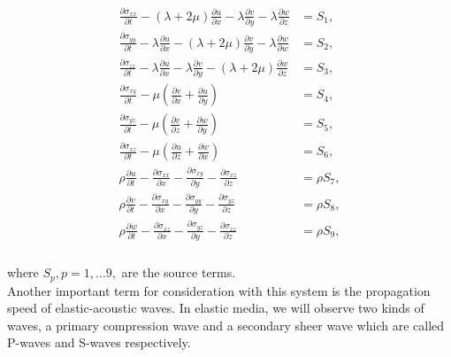 \begin{align}
    \begin{split}
    \frac{\partial \sigma_{xx}}{\partial t} - \left(\lambda  + 2\mu\right)\frac{\partial u}{\partial x} - \lambda \frac{\partial v}{\partial y} - \lambda\frac{\partial w}{\partial z} &= S_1, \\    
    \frac{\partial \sigma_{yy}}{\partial t} - \lambda \frac{\partial u}{\partial x} - \left( \lambda + 2 \mu \right)\frac{\partial v}{\partial y} - \lambda \frac{\partial w}{\partial w} &= S_2, \\
    \frac{\partial \sigma_{zz}}{\partial t} - \lambda \frac{\partial u}{\partial x} - \lambda \frac{\partial v}{\partial y} - \left(\lambda + 2\mu\right)\frac{\partial w}{\partial z} &= S_3, \\
    \frac{\partial \sigma_{xy}}{\partial t} - \mu \left(\frac{\partial v}{\partial x} + \frac{\partial u}{\partial y}\right) &= S_4, \\ 
    \frac{\partial \sigma_{yz}}{\partial t} - \mu \left(\frac{\partial v}{\partial z} + \frac{\partial w}{\partial y}\right) &= S_5, \\
    \frac{\partial \sigma_{xz}}{\partial t} - \mu \left(\frac{\partial u}{\partial z} + \frac{\partial w}{\partial x}\right) &= S_6, \\
    \rho \frac{\partial u}{\partial t} - \frac{\partial \sigma_{xx}}{\partial x} - \frac{\partial \sigma_{xy}}{\partial y} - \frac{\partial \sigma_{xz}}{\partial z} &= \rho S_7, \\
    \rho \frac{\partial v}{\partial t} - \frac{\partial \sigma_{xy}}{\partial x} - \frac{\partial \sigma_{yy}}{\partial y} - \frac{\partial \sigma_{yz}}{\partial z} &= \rho S_8, \\
    \rho \frac{\partial w}{\partial t} - \frac{\partial \sigma_{xz}}{\partial x} - \frac{\partial \sigma_{yz}}{\partial y} - \frac{\partial \sigma_{zz}}{\partial z} &= \rho S_9, \\
\end{split}
\label{eq:setofequations}
\end{align}

where $S_p, p = 1,\dots9,$ are the source terms. \\

Another important term for consideration with this system is the propagation speed of elastic-acoustic waves. In elastic media, we will 
observe two kinds of waves, a primary compression wave and a secondary sheer wave which are called P-waves and S-waves respectively.\\

